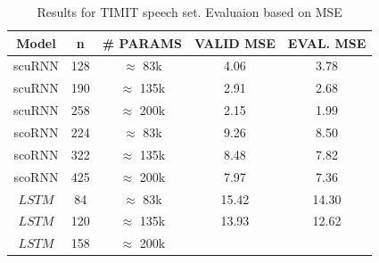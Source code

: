 \documentclass[letterpaper]{article} %
\begin{document}
\begin{table}[h]
\label{t3}
\begin{center}
\caption{Results for TIMIT speech set. Evaluaion based on MSE}
\renewcommand{\arraystretch}{1.2}
\begin{tabular}{ | c | c | c | c |c |} 
\hline
\multicolumn{1}{|c|}{Model}  & 
\multicolumn{1}{|c|}{n} & 
\multicolumn{1}{|c|}{\# PARAMS}& 
\multicolumn{1}{|c|}{VALID MSE} &
\multicolumn{1}{|c|}{EVAL. MSE}
\\ \hline
scuRNN  
& \multicolumn{1}{|c|}{128} 
& \multicolumn{1}{|c|}{$\approx$ 83k}
& \multicolumn{1}{|c|}{4.06}
& \multicolumn{1}{|c|}{3.78}
\\\hline
scuRNN  
& \multicolumn{1}{|c|}{190} 
& \multicolumn{1}{|c|}{$\approx$ 135k}
& \multicolumn{1}{|c|}{2.91}
& \multicolumn{1}{|c|}{2.68}
\\\hline
scuRNN  
& \multicolumn{1}{|c|}{258} 
& \multicolumn{1}{|c|}{$\approx$ 200k}
& \multicolumn{1}{|c|}{2.15}
& \multicolumn{1}{|c|}{1.99}
\\\hline
scoRNN  
& \multicolumn{1}{|c|}{224} 
& \multicolumn{1}{|c|}{$\approx$ 83k}
& \multicolumn{1}{|c|}{9.26}
& \multicolumn{1}{|c|}{8.50}
\\\hline
scoRNN 
& \multicolumn{1}{|c|}{322} 
& \multicolumn{1}{|c|}{$\approx$ 135k}
& \multicolumn{1}{|c|}{8.48} 
& \multicolumn{1}{|c|}{7.82}
\\\hline
scoRNN 
& \multicolumn{1}{|c|}{425} 
& \multicolumn{1}{|c|}{$\approx$ 200k}
& \multicolumn{1}{|c|}{7.97}
& \multicolumn{1}{|c|}{7.36}
\\\hline
$LSTM$  
& \multicolumn{1}{|c|}{84} 
& \multicolumn{1}{|c|}{$\approx$ 83k}
& \multicolumn{1}{|c|}{15.42} 
& \multicolumn{1}{|c|}{14.30}
\\\hline
$LSTM$  
& \multicolumn{1}{|c|}{120} 
& \multicolumn{1}{|c|}{$\approx$ 135k}
& \multicolumn{1}{|c|}{13.93} 
& \multicolumn{1}{|c|}{12.62}
\\\hline
$LSTM$  
& \multicolumn{1}{|c|}{158} 
& \multicolumn{1}{|c|}{$\approx$ 200k}

\end{tabular}
\end{center}
\end{table}
\end{document}
